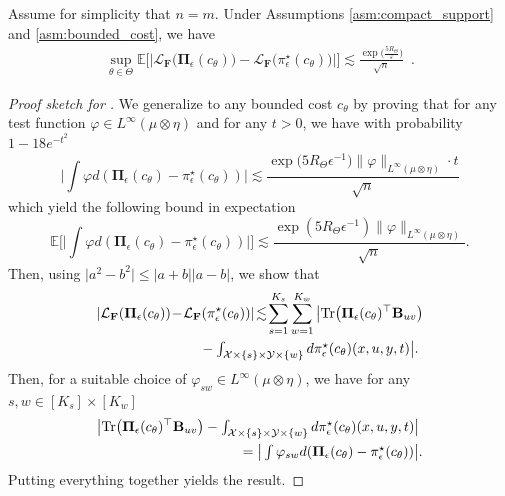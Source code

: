 \documentclass{article}
\theoremstyle{definition}
\newcommand{\bbE}{\mathbb{E}}
\begin{document}
\begin{boxthm} 
\label{thm:subgaussian_fluctuations}
    Assume for simplicity that $n=m$. Under Assumptions \ref{asm:compact_support} and \ref{asm:bounded_cost}, we have
        \begin{align*}
        \sup\limits_{\theta \in \Theta }\bbE\big[\big\lvert \mathcal{L}_\mathbf{F}\big(\mathbf{\Pi}_\epsilon(c_\theta)\big) \!-\! \mathcal{L}_\mathbf{F}\big(\pi^\star_\epsilon(c_\theta)\big)\big\lvert\big]\! \lesssim\! \frac{\exp\big(\frac{5R_\Theta}{\varepsilon}\big) }{\sqrt{n}}\enspace.
    \end{align*}
\end{boxthm}
\begin{proof}[Proof sketch for ]
    We generalize \citet[Theorem 6]{rigollet2022sample} to any bounded cost $c_\theta$ by proving that for any test function $\varphi\in L^\infty(\mu\otimes\eta)$ and for any $t>0$, we have with probability $1-18e^{-t^2}$
    \begin{equation*}\label{eq:sample_complexity}
        \big\lvert \!\textstyle\int\!\varphi d(\mathbf{\Pi}_\epsilon(c_\theta)-\pi^\star_\epsilon(c_\theta))\big\rvert \lesssim \displaystyle\frac{\exp\big(5R_\Theta \epsilon^{-1}\big)\lVert\varphi\rVert_{L^\infty(\mu\otimes \eta)}\cdot t}{\sqrt{n}}
    \end{equation*}
    which yield the following bound in expectation
    \begin{equation*}
        \bbE\big[\big\lvert \textstyle\int\varphi d(\mathbf{\Pi}_\epsilon(c_\theta)-\pi^\star_\epsilon(c_\theta))\big\rvert\big] \lesssim \frac{\exp(5R_\Theta \epsilon^{-1})\lVert\varphi\rVert_{L^\infty(\mu\otimes \eta)}}{\sqrt{n}}.
    \end{equation*}
    Then, using $\lvert a^2-b^2\rvert\leq\lvert a+b\rvert\lvert a-b\rvert$, we show that
    \begin{align*}
        \lvert\mathcal{L}_{\mathbf{F}}(\mathbf{\Pi}_\epsilon(c_\theta)) \!-\! \mathcal{L}_{\mathbf{F}}(\pi^\star_\epsilon(c_\theta)) \rvert \!\lesssim\!\sum_{s=1}^{K_s}\sum_{w=1}^{K_w} \big\lvert\textnormal{Tr}\big(\mathbf{\Pi}_\epsilon(c_\theta)^\top\mathbf{B}_{uv}\big)&\\&\hspace{-16em}- \textstyle\int_{\mathcal{X}\times\lbrace s\rbrace\times\mathcal{Y}\times \lbrace w\rbrace}d\pi^\star_\epsilon(c_\theta)(x,u,y,t) \big\lvert.
    \end{align*}
    Then, for a suitable choice of $\varphi_{sw}\in L^\infty(\mu\otimes\eta)$, we have for any $s,w\in[K_s]\times[K_w]$
    \begin{align*}
        \big\lvert\textnormal{Tr}\big(\mathbf{\Pi}_\epsilon(c_\theta)^\top\mathbf{B}_{uv}\big)- \textstyle\int_{\mathcal{X}\times\lbrace s\rbrace\times\mathcal{Y}\times \lbrace w\rbrace}d\pi^\star_\epsilon(c_\theta)(x,u,y,t) \big\lvert &\\&\hspace{-12.9em}= \big\lvert\textstyle\int\varphi_{sw} d(\mathbf{\Pi}_\epsilon(c_\theta)-\pi^\star_\epsilon(c_\theta))\big\rvert.
    \end{align*}
    Putting everything together yields the result.
\end{proof}
\end{document}
